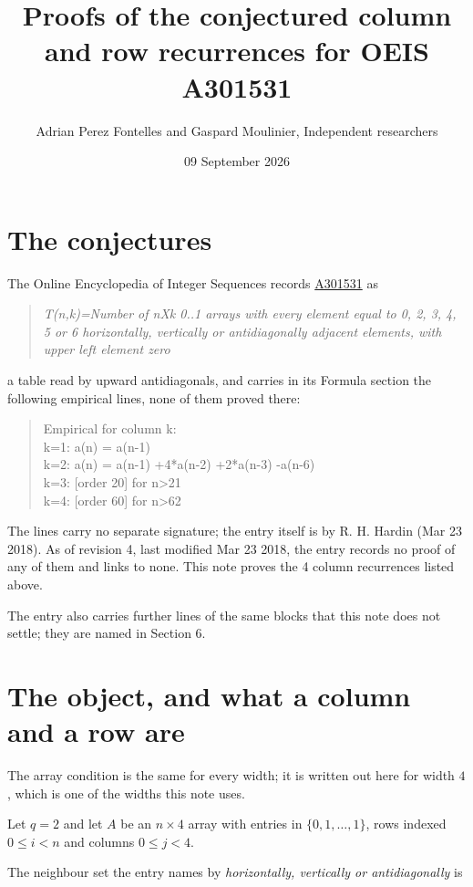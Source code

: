 \documentclass[11pt]{article}
\title{Proofs of the conjectured column and row recurrences for OEIS A301531}
\author{Adrian Perez Fontelles and Gaspard Moulinier, Independent researchers}
\date{09 September 2026}
\theoremstyle{definition}
\begin{document}
\maketitle
\section{The conjectures}

The Online Encyclopedia of Integer Sequences records \href{https://oeis.org/A301531}{A301531} as

\begin{quote}\itshape T(n,k)=Number of nXk 0..1 arrays with every element equal to 0, 2, 3, 4, 5 or 6 horizontally, vertically or antidiagonally adjacent elements, with upper left element zero\end{quote}

a table read by upward antidiagonals, and carries in its Formula section the following empirical lines, none of them proved there:

\begin{quote}\ttfamily Empirical for column k:\\
k=1: a(n) = a(n-1)\\k=2: a(n) = a(n-1) +4*a(n-2) +2*a(n-3) -a(n-6)\\k=3: [order 20] for n>21\\k=4: [order 60] for n>62\end{quote}

The lines carry no separate signature; the entry itself is by R. H. Hardin (Mar 23 2018). As of revision 4, last modified Mar 23 2018, the entry records no proof of any of them and links to none. This note proves the 4 column recurrences listed above.

The entry also carries further lines of the same blocks that this note does not settle; they are named in Section 6.

\section{The object, and what a column and a row are}

The array condition is the same for every width; it is written out here for width $4$, which is one of the widths this note uses.

Let $q = 2$ and let $A$ be an $n \times 4$ array with entries in $\{0,1,\dots,1\}$, rows indexed $0 \le i < n$ and columns $0 \le j < 4$.

The neighbour set the entry names by {\itshape horizontally, vertically or antidiagonally} is
\end{document}
